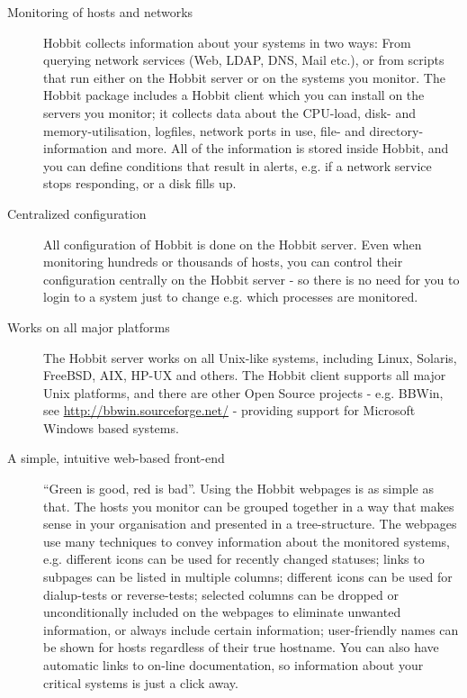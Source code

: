 \begin{description}

\item[Monitoring of hosts and networks] Hobbit collects information
  about your systems in two ways: From querying network services (Web,
  LDAP, DNS, Mail etc.), or from scripts that run either on the Hobbit
  server or on the systems you monitor. The Hobbit package includes a
  Hobbit client which you can install on the servers you monitor; it
  collects data about the CPU-load, disk- and memory-utilisation,
  logfiles, network ports in use, file- and directory-information and
  more. All of the information is stored inside Hobbit, and you can
  define conditions that result in alerts, e.g. if a network service
  stops responding, or a disk fills up. 

\item[Centralized configuration] All configuration of Hobbit is done
  on the Hobbit server. Even when monitoring hundreds or thousands of
  hosts, you can control their configuration centrally on the Hobbit
  server - so there is no need for you to login to a system just to
  change e.g. which processes are monitored. 

\item[Works on all major platforms] The Hobbit server works on all
  Unix-like systems, including Linux, Solaris, FreeBSD, AIX, HP-UX and
  others. The Hobbit client supports all major Unix platforms, and
  there are other Open Source projects - e.g. BBWin, see
  \url{http://bbwin.sourceforge.net/} - providing support for
  Microsoft Windows based systems. 

\item[A simple, intuitive web-based front-end] ``Green is good, red is
  bad''. Using the Hobbit webpages is as simple as that. The hosts you
  monitor can be grouped together in a way that makes sense in your
  organisation and presented in a tree-structure. The webpages use
  many techniques to convey information about the monitored systems,
  e.g. different icons can be used for recently changed statuses;
  links to subpages can be listed in multiple columns; different icons
  can be used for dialup-tests or reverse-tests; selected columns can
  be dropped or unconditionally included on the webpages to eliminate
  unwanted information, or always include certain information;
  user-friendly names can be shown for hosts regardless of their true
  hostname. You can also have automatic links to on-line
  documentation, so information about your critical systems is just a
  click away. 


\end{description}

